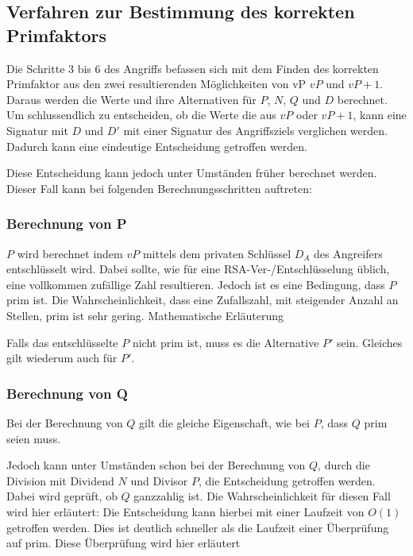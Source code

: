             \subsection{Verfahren zur Bestimmung des korrekten Primfaktors}
                Die Schritte 3 bis 6 des Angriffs befassen sich mit dem Finden des korrekten Primfaktor aus den zwei resultierenden Möglichkeiten von vP $vP$ und $vP+1$. Daraus werden die Werte und ihre Alternativen für $P$, $N$, $Q$ und $D$ berechnet. 
                Um schlussendlich zu entscheiden, ob die Werte die aus $vP$ oder $vP+1$, kann eine Signatur mit $D$ und $D'$ mit einer Signatur des Angriffsziels verglichen werden. Dadurch kann eine eindeutige Entscheidung getroffen werden. 

                Diese Entscheidung kann jedoch unter Umständen früher berechnet werden. Dieser Fall kann bei folgenden Berechnungsschritten  auftreten:

                

                \subsubsection{Berechnung von P}
                    $P$ wird berechnet indem $vP$ mittels dem privaten Schlüssel $D_{A}$ des Angreifers entschlüsselt wird. Dabei sollte, wie für eine \ac{RSA}-Ver-/Entschlüsselung üblich, eine vollkommen zufällige Zahl resultieren. Jedoch ist es eine Bedingung, dass $P$ prim ist. 
                    Die Wahrscheinlichkeit, dass eine Zufallszahl, mit steigender Anzahl an Stellen, prim ist sehr gering. 
                    Mathematische Erläuterung %

                    Falls das entschlüsselte $P$ nicht prim ist, muss es die Alternative $P'$ sein. Gleiches gilt wiederum auch für $P'$.

                \subsubsection{Berechnung von Q} 
                    Bei der Berechnung von $Q$ gilt die gleiche Eigenschaft, wie bei $P$, dass $Q$ prim seien muss.

                    Jedoch kann unter Umständen schon bei der Berechnung von $Q$, durch die Division mit Dividend $N$ und Divisor $P$, die Entscheidung getroffen werden. Dabei wird geprüft, ob $Q$ ganzzahlig ist. 
                    Die Wahrscheinlichkeit für diesen Fall wird hier erläutert: %
                    Die Entscheidung kann hierbei mit einer Laufzeit von $O(1)$ getroffen werden. Dies ist deutlich schneller als die Laufzeit einer Überprüfung auf prim. 
                    Diese Überprüfung wird hier erläutert %

